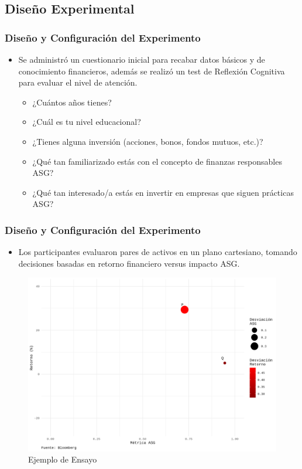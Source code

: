 \documentclass{beamer}
\begin{document}
\subsection{Diseño Experimental}

\begin{frame}
    \frametitle{Diseño y Configuración del Experimento}
    \begin{itemize}
        \item Se administró un cuestionario inicial para recabar datos básicos y de conocimiento financieros, además se realizó un test de Reflexión Cognitiva para evaluar el nivel de atención.
        
        \begin{itemize}
            \item ¿Cuántos años tienes?
            \item ¿Cuál es tu nivel educacional?
            
            \item ¿Tienes alguna inversión (acciones, bonos, fondos mutuos, etc.)?
            \item ¿Qué tan familiarizado estás con el concepto de finanzas responsables ASG?
            \item ¿Qué tan interesado/a estás en invertir en empresas que siguen prácticas ASG?
        \end{itemize}
    \end{itemize}
\end{frame}

\begin{frame}
    \frametitle{Diseño y Configuración del Experimento}
    \begin{itemize}
        \item Los participantes evaluaron pares de activos en un plano cartesiano, tomando decisiones basadas en retorno financiero versus impacto ASG.
    \end{itemize}
    \begin{figure}
        \centering
        \includegraphics[width=0.65\linewidth]{plot_4YTD.png}
        \caption{Ejemplo de Ensayo}
    \end{figure}
\end{frame}
\end{document}
